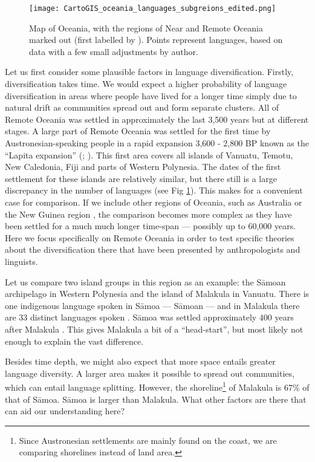 \documentclass[unnumsec,webpdf,modern,medium]{oup-authoring-template}
\begin{document}
\begin{figure}
\centering
\texttt{[image: CartoGIS\_oceania\_languages\_subgreions\_edited.png]}
\caption{Map of Oceania, with the regions of Near and Remote Oceania marked out (first labelled by \citet{pawley1973dating}). Points represent languages, based on data \citet{glottolog3} with a few small adjustments by author.} 
\label{RO_overnight_coloured_dots}
\end{figure}

Let us first consider some plausible factors in language diversification. Firstly, diversification takes time. We would expect a higher probability of language diversification in areas where people have lived for a longer time simply due to natural drift as communities spread out and form separate clusters. All of Remote Oceania was settled in approximately the last 3,500 years but at different stages. A large part of Remote Oceania was settled for the first time by Austronesian-speaking people in a rapid expansion 3,600 - 2,800 BP known as the ``Lapita expansion'' (\citet[106-7]{bellwood2006austronesians}; \citet[137]{rieth_cochrane_2018}). This first area covers all islands of Vanuatu, Temotu, New Caledonia, Fiji and parts of Western Polynesia. The dates of the first settlement for these islands are relatively similar, but there still is a large discrepancy in the number of languages (see Fig \ref{RO_overnight_coloured_dots}). This makes for a convenient case for comparison. If we include other regions of Oceania, such as Australia or the New Guinea region \citep{ross2017_new_guinea_region}, the comparison becomes more complex as they have been settled for a much much longer time-span --- possibly up to 60,000 years. Here we focus specifically on Remote Oceania in order to test specific theories about the diversification there that have been presented by anthropologists and linguists.

Let us compare two island groups in this region as an example: the S\={a}moan archipelago in Western Polynesia and the island of Malakula in Vanuatu. There is one indigenous language spoken in S\={a}moa ---  S\={a}moan --- and in Malakula there are 33 distinct languages spoken \citep{glottolog4_5}. S\={a}moa was settled approximately 400 years after Malakula \citep[137-8]{rieth_cochrane_2018}. This gives Malakula a bit of a ``head-start'', but most likely not enough to explain the vast difference.

Besides time depth, we might also expect that more space entails greater language diversity. A larger area makes it possible to spread out communities, which can entail language splitting. However, the shoreline\footnote{Since Austronesian settlements are mainly found on the coast, we are comparing shorelines instead of land area.} of Malakula is 67\% of that of S\={a}moa. S\={a}moa is larger than Malakula. What other factors are there that can aid our understanding here?
\end{document}
